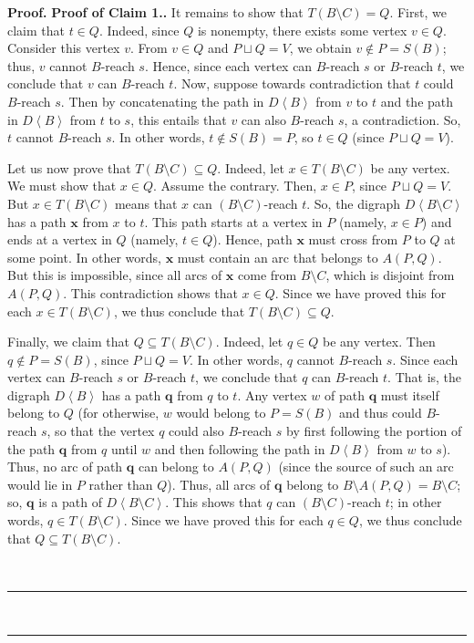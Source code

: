 \documentclass[numbers=enddot,12pt,final,onecolumn,notitlepage]{scrartcl}%
\theoremstyle{definition}
\newenvironment{proof}[1][Proof]{\noindent\textbf{#1.} }{\ \rule{0.5em}{0.5em}}
\theoremstyle{plainsl}
\begin{document}
\begin{proof}
\begin{proof}[Proof of Claim 1.]
    It remains to show that $T(B\setminus C) = Q$. First, we claim that $t \in Q$. Indeed, since $Q$ is nonempty, there exists some vertex $v \in Q$. Consider this vertex $v$. From $v \in Q$ and $P \sqcup Q = V$, we obtain $v \notin P = S(B)$; thus, $v$ cannot $B$-reach $s$. Hence, since each vertex can $B$-reach $s$ or $B$-reach $t$, we conclude that $v$ can $B$-reach $t$. Now, suppose towards contradiction that $t$ could $B$-reach $s$. Then by concatenating the path in $D \left\langle B \right\rangle$ from $v$ to $t$ and the path in $D \left\langle B \right\rangle$ from $t$ to $s$, this entails that $v$ can also $B$-reach $s$, a contradiction. So, $t$ cannot $B$-reach $s$. In other words, $t \notin S(B) = P$, so $t \in Q$ (since $P \sqcup Q = V$).

    Let us now prove that $T(B\setminus C) \subseteq Q$. Indeed, let $x \in T(B\setminus C)$ be any vertex. We must show that $x \in Q$. Assume the contrary. Then, $x \in P$, since $P \sqcup Q = V$. But $x \in T(B\setminus C)$ means that $x$ can $(B\setminus C)$-reach $t$. So, the digraph $D \left\langle B \setminus C \right\rangle$ has a path $\textbf{x}$ from $x$ to $t$. This path starts at a vertex in $P$ (namely, $x \in P$) and ends at a vertex in $Q$ (namely, $t \in Q$). Hence, path $\textbf{x}$ must cross from $P$ to $Q$ at some point. In other words, $\textbf{x}$ must contain an arc that belongs to $A(P,Q)$. But this is impossible, since all arcs of $\textbf{x}$ come from $B \setminus C$, which is disjoint from $A(P,Q)$. This contradiction shows that $x \in Q$. Since we have proved this for each $x \in T(B \setminus C)$, we thus conclude that $T(B \setminus C) \subseteq Q$.

    Finally, we claim that $Q \subseteq T(B\setminus C)$. Indeed, let $q \in Q$ be any vertex. Then $q \notin P = S(B)$, since $P \sqcup Q = V$. In other words, $q$ cannot $B$-reach $s$. Since each vertex can $B$-reach $s$ or $B$-reach $t$, we conclude that $q$ can $B$-reach $t$. That is, the digraph $D \left\langle B \right\rangle$ has a path $\textbf{q}$ from $q$ to $t$. Any vertex $w$ of path $\textbf{q}$ must itself belong to $Q$ (for otherwise, $w$ would belong to $P = S(B)$ and thus could $B$-reach $s$, so that the vertex $q$ could also $B$-reach $s$ by first following the portion of the path $\textbf{q}$ from $q$ until $w$ and then following the path in $D \left\langle B \right\rangle$ from $w$ to $s$). Thus, no arc of path $\textbf{q}$ can belong to $A(P,Q)$ (since the source of such an arc would lie in $P$ rather than $Q$). Thus, all arcs of $\textbf{q}$ belong to $B \setminus A(P,Q) = B \setminus C$; so, $\textbf{q}$ is a path of $D \left\langle B \setminus C \right\rangle$. This shows that $q$ can $(B \setminus C)$-reach $t$; in other words, $q \in T(B\setminus C)$. Since we have proved this for each $q \in Q$, we thus conclude that $Q \subseteq T(B \setminus C)$.


\end{proof}
\end{proof}
\end{document}
